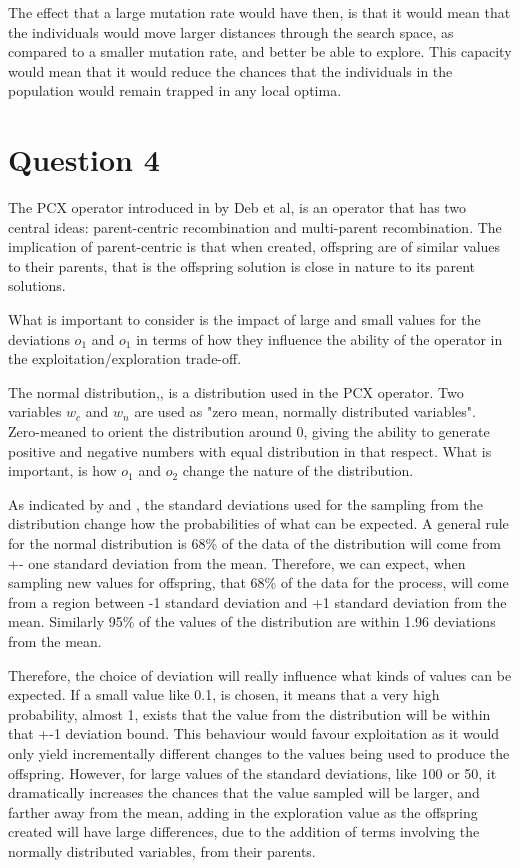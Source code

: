 \documentclass[12pt]{article}
\begin{document}
The effect that a large mutation rate would have then, is that it would mean that the individuals would move larger distances through the search space, as compared to a smaller mutation rate, and better be able to explore. This capacity would mean that it would reduce the chances that the individuals in the population would remain trapped in any local optima. 


\section{Question 4}
The PCX operator introduced in \cite{deb_joshi_anand_2002} by Deb et al, is an operator that has two central ideas: parent-centric recombination and multi-parent recombination.
The implication of parent-centric is that when created, offspring are of similar values to their parents, that is the offspring solution is close in nature to its parent solutions. 

What is important to consider is the impact of large and small values for the deviations $o_1$ and $o_1$ in terms of how they influence the ability of the operator in the exploitation/exploration trade-off.

The normal distribution,\cite{harrison_2017}, is a distribution used in the PCX operator. Two variables \cite{deb_joshi_anand_2002} $w_c$ and $w_n$ are used as "zero mean, normally distributed variables". Zero-meaned to orient the distribution around 0, giving the ability to generate positive and negative numbers with equal distribution in that respect. What is important, is how  $o_1$ and  $o_2$ change the nature of the distribution.

As indicated by  \cite{areas_under_normal_distribution} and  \cite{normal_distribution}, the standard deviations used for the sampling from the distribution change how the probabilities of what can be expected. A general rule for the normal distribution \cite{normal_distribution} is 68\% of the data of the distribution will come from +- one standard deviation from the mean. Therefore, we can expect, when sampling new values for offspring, that 68\% of the data for the process, will come from a region between -1 standard deviation and +1 standard deviation from the mean. Similarly 95\% of the values of the distribution are within 1.96 deviations from the mean.

Therefore, the choice of deviation will really influence what kinds of values can be expected. If a small value like 0.1, is chosen, it means that a very high probability, almost 1, exists that the value from the distribution will be within that +-1 deviation bound. This behaviour would favour exploitation as it would only yield incrementally different changes to the values being used to produce the offspring. However, for large values of the standard deviations, like 100 or 50, it dramatically increases the chances that the value sampled will be larger, and farther away from the mean, adding in the exploration value as the offspring created will have large differences, due to the addition of terms involving the normally distributed variables, from their parents.
\end{document}
